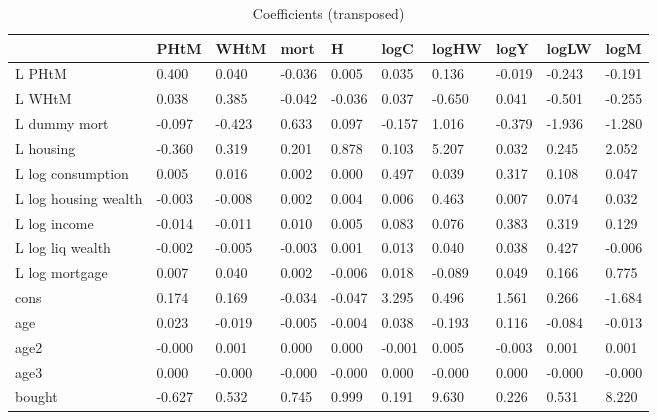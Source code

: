 \begin{table}[htbp]
\caption{\label{clabel} Coefficients (transposed)}\centering\medskip
\begin{tabular}{llllllllll} \hline \hline
 & PHtM  & WHtM  & mort  & H  & logC  & logHW  & logY  & logLW  & logM  \\  \hline 
L PHtM &     0.400 &     0.040 &    -0.036 &     0.005 &     0.035 &     0.136 &    -0.019 &    -0.243 &    -0.191 \\  
L WHtM &     0.038 &     0.385 &    -0.042 &    -0.036 &     0.037 &    -0.650 &     0.041 &    -0.501 &    -0.255 \\  
L dummy mort &    -0.097 &    -0.423 &     0.633 &     0.097 &    -0.157 &     1.016 &    -0.379 &    -1.936 &    -1.280 \\  
L housing &    -0.360 &     0.319 &     0.201 &     0.878 &     0.103 &     5.207 &     0.032 &     0.245 &     2.052 \\  
L log consumption &     0.005 &     0.016 &     0.002 &     0.000 &     0.497 &     0.039 &     0.317 &     0.108 &     0.047 \\  
L log housing wealth &    -0.003 &    -0.008 &     0.002 &     0.004 &     0.006 &     0.463 &     0.007 &     0.074 &     0.032 \\  
L log income &    -0.014 &    -0.011 &     0.010 &     0.005 &     0.083 &     0.076 &     0.383 &     0.319 &     0.129 \\  
L log liq wealth &    -0.002 &    -0.005 &    -0.003 &     0.001 &     0.013 &     0.040 &     0.038 &     0.427 &    -0.006 \\  
L log mortgage &     0.007 &     0.040 &     0.002 &    -0.006 &     0.018 &    -0.089 &     0.049 &     0.166 &     0.775 \\  
cons &     0.174 &     0.169 &    -0.034 &    -0.047 &     3.295 &     0.496 &     1.561 &     0.266 &    -1.684 \\  
age &     0.023 &    -0.019 &    -0.005 &    -0.004 &     0.038 &    -0.193 &     0.116 &    -0.084 &    -0.013 \\  
age2 &    -0.000 &     0.001 &     0.000 &     0.000 &    -0.001 &     0.005 &    -0.003 &     0.001 &     0.001 \\  
age3 &     0.000 &    -0.000 &    -0.000 &    -0.000 &     0.000 &    -0.000 &     0.000 &    -0.000 &    -0.000 \\  
bought &    -0.627 &     0.532 &     0.745 &     0.999 &     0.191 &     9.630 &     0.226 &     0.531 &     8.220 \\  
\hline \hline \end{tabular}
\end{table}
